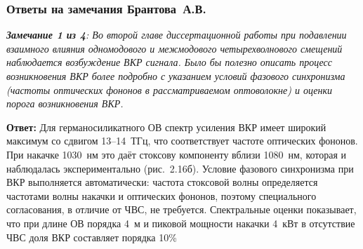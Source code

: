 \begin{frame}
	\frametitle{Ответы на замечания Брантова~А.В.}
	\small{\textit{\textbf{Замечание 1 из 4}: Во второй главе диссертационной работы при подавлении взаимного влияния одномодового и межмодового четырехволнового смещений наблюдается возбуждение ВКР сигнала. Было бы полезно описать процесс возникновения ВКР более подробно с указанием условий фазового синхронизма (частоты оптических фононов в рассматриваемом оптоволокне) и оценки порога возникновения ВКР. }}
	
	\hfill
	
	\textbf{Ответ:} Для германосиликатного ОВ спектр усиления ВКР имеет широкий максимум со сдвигом 13--14~ТГц, что соответствует частоте оптических фононов. При накачке 1030~нм это даёт стоксову компоненту вблизи 1080~нм, которая и наблюдалась экспериментально (рис.~2.16б). Условие фазового синхронизма при ВКР выполняется автоматически: частота стоксовой волны определяется частотами волны накачки и оптических фононов, поэтому специального согласования, в отличие от ЧВС, не требуется. Спектральные оценки показывает, что при длине ОВ порядка 4~м и пиковой мощности накачки 4~кВт в отсутствие ЧВС доля ВКР составляет порядка 10\%
	
\end{frame}



